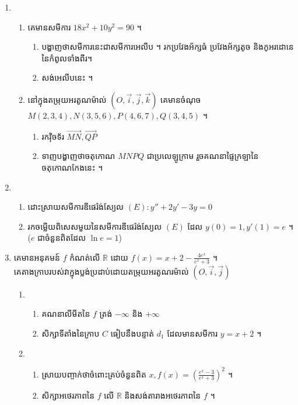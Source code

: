\documentclass{officialexam}
\begin{document}
\begin{enumerate}[I]
		\item \begin{enumerate}[1]
			\item គេមានសមីការ $18x^2+10y^2=90$ ។
			\begin{enumerate}[k]
				\item បង្ហាញថាសមីការនេះជាសមីការអេលីប ។ រកប្រវែងអ័ក្សធំ ប្រវែងអ័ក្សតូច និងកូអរដោនេនៃកំពូលទាំងពីរ។
				\item សង់អេលីបនេះ ។
			\end{enumerate}
			\item នៅក្នុងតម្រុយអរតូណម៉ាល់ $\left(O, \vec{i}, \vec{j}, \vec{k}\right)$ គេមានចំណុច $M\left(2,3,4\right), N\left(3,5,6\right), P\left(4,6,7\right), Q\left(3,4,5\right)$ ។
			\begin{enumerate}[k]
				\item រកវ៉ិចទ័រ $\overrightarrow{MN}, \overrightarrow{QP}$
				\item ទាញបង្ហាញថាចតុកោណ $MNPQ$ ជាប្រលេឡូក្រាម រួចគណនាផ្ទៃក្រឡានៃចតុកោណកែងនេះ ។
			\end{enumerate}
		\end{enumerate}
		\item \begin{enumerate}[k]
			\item ដោះស្រាយសមីការឌីផេរ៉ង់ស្យែល $(E): y''+2y'-3y=0$
			\item រកចម្លើយពិសេសមួយនៃសមីការឌីផេរ៉ង់ស្យែល $(E)$ ដែល $y(0)=1, y'(1)=e$ ។ ($e$ ជាចំនួនពិតដែល $\ln e=1$)
		\end{enumerate}
		\item គេមានអនុគមន៍ $f$ កំណត់លើ $\mathbb{R}$ ដោយ $f(x)=x+2-\frac{4e^x}{e^x+3}$ ។\\
		គេតាងក្រាបរបស់វាក្នុងប្លង់ប្រដាប់ដោយតម្រុយអរតូណរម៉ាល់ $\left(O,\vec{i}, \vec{j}\right)$
		\begin{enumerate}[1]
			\item \begin{enumerate}[k]
				\item គណនាលីមីតនៃ $f$ ត្រង់ $-\infty$ និង $+\infty$
				\item សិក្សាទីតាំងនៃក្រាប $C$ ធៀបនឹងបន្ទាត់ $d_1$ ដែលមានសមីការ $y=x+2$ ។
			\end{enumerate}
			\item \begin{enumerate}[k]
				\item ស្រាយបញ្ចាក់ថាចំពោះគ្រប់ចំនួនពិត $x, f(x)=\left(\frac{e^x-3}{e^x+3}\right)^2$ ។
				\item សិក្សាអថេរភាពនៃ $f$ លើ $\mathbb{R}$ និងសង់តារាងអថេរភាពនៃ $f$ ។

\end{enumerate}
\end{enumerate}
\end{enumerate}
\end{document}

